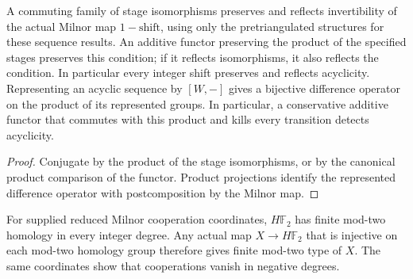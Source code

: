\begin{proposition}
  \label{prop:inverse-sequence-acyclic-transport}
  \leanok
  A commuting family of stage isomorphisms preserves and reflects
  invertibility of the actual Milnor map $1-\mathrm{shift}$, using only the
  pretriangulated structures for these sequence results. An additive
  functor preserving the product of the specified stages preserves this condition; if it
  reflects isomorphisms, it also reflects the condition. In particular
  every integer shift preserves and reflects acyclicity. Representing an
  acyclic sequence by $[W,-]$ gives a bijective difference operator on
  the product of its represented groups.
  In particular, a conservative additive functor that commutes with
  this product and kills every transition detects acyclicity.
\end{proposition}
\begin{proof}
  Conjugate by the product of the stage isomorphisms, or by the canonical
  product comparison of the functor. Product projections identify the
  represented difference operator with postcomposition by the Milnor map.
  \leanok
\end{proof}

\begin{proposition}
  \label{prop:hf2-finite-mod2-coordinates}
  \leanok
  For supplied reduced Milnor cooperation coordinates, $H\mathbb F_2$
  has finite mod-two homology in every integer degree. Any actual map
  $X\to H\mathbb F_2$ that is injective on each mod-two homology group
  therefore gives finite mod-two type of $X$.
  The same coordinates show that cooperations vanish in negative degrees.
\end{proposition}

